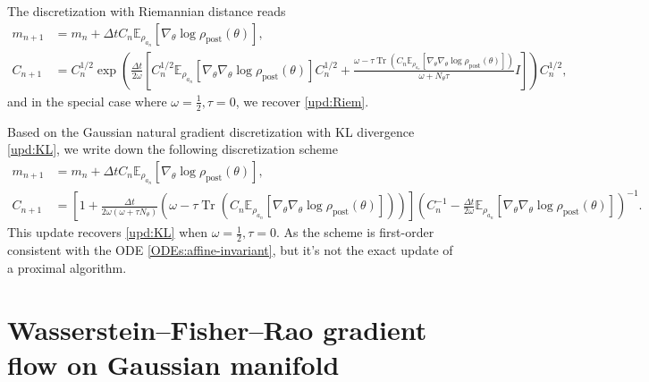 \documentclass[11pt]{article}
\theoremstyle{plain}
\theoremstyle{definition}
\theoremstyle{remark}
\newcommand{\E}{\mathbb{E}}
\newcommand{\Tr}{\operatorname{Tr}}
\newcommand{\post}{\mathrm{post}}
\begin{document}
The discretization with Riemannian distance reads
\begin{equation}\label{upd:affine-invariant-Riem}
    \begin{aligned}
        m_{n+1} &= m_n + \Delta t C_n \E_{\rho_{a_n}} [\nabla_\theta \log \rho_\post (\theta)], \\
        C_{n+1} &= C_n^{1/2} \exp \left(\frac{\Delta t}{2\omega} \left[C_n^{1/2}\mathbb{E}_{\rho_{a_n}}[\nabla_\theta \nabla_\theta \log \rho_{\mathrm{post}} (\theta)]C_n^{1/2} + \frac{\omega - \tau\Tr(C_n\mathbb{E}_{\rho_{a_n}}[\nabla_\theta \nabla_\theta \log \rho_{\mathrm{post}} (\theta)])}{\omega+N_\theta\tau}I\right]\right)C_n^{1/2},
    \end{aligned}
\end{equation}
and in the special case where $\omega = \frac{1}{2}, \tau = 0$, we recover \eqref{upd:Riem}.

Based on the Gaussian natural gradient discretization with KL divergence \eqref{upd:KL}, we write down the following discretization scheme
\begin{equation}
    \begin{aligned}
        m_{n+1} &= m_n + \Delta t C_n \E_{\rho_{a_n}} [\nabla_\theta \log \rho_\post (\theta)], \\
        C_{n+1} &= \left[ 1 + \frac{\Delta t}{2\omega (\omega + \tau N_\theta)} (\omega - \tau \Tr(C_n \E_{\rho_{a_n}} [\nabla_\theta \nabla_\theta \log \rho_\post (\theta)])) \right] \left( C_n^{-1} - \frac{\Delta t}{2\omega} \E_{\rho_{a_n}} [\nabla_\theta \nabla_\theta \log \rho_\post (\theta)] \right)^{-1}.
    \end{aligned}
\end{equation}
This update recovers \eqref{upd:KL} when $\omega = \frac{1}{2}, \tau = 0$. As the scheme is first-order consistent with the ODE \eqref{ODEs:affine-invariant}, but it's not the exact update of a proximal algorithm.


\section{Wasserstein--Fisher--Rao gradient flow on Gaussian manifold}\label{sec:WFR}
\end{document}
